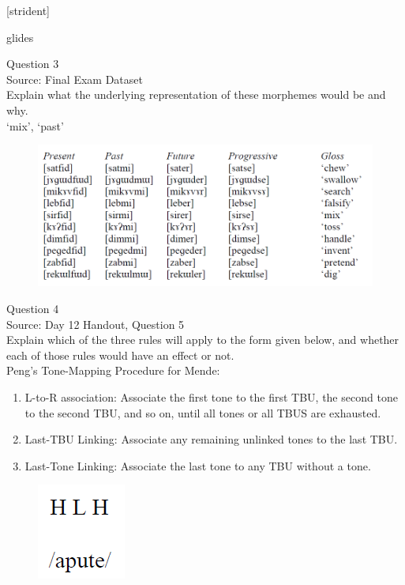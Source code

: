 \documentclass[12pt]{article}
\begin{document}
{[strident]}

glides


\newpage

{\large Question 3}\\

Source: Final Exam Dataset\\

Explain what the underlying representation of these morphemes would be and why.\\

`mix', `past'

\begin{figure}[H]
\includegraphics{../images/final_dataset.png}
\end{figure}

\newpage

{\large Question 4}\\

Source: Day 12 Handout, Question 5\\

Explain which of the three rules will apply to the form given below, and whether each of those rules would have an effect or not.\\

Peng’s Tone-Mapping Procedure for Mende: \begin{enumerate} \item L-to-R association: Associate the first tone to the first TBU, the second tone to the second TBU, and so on, until all tones or all TBUS are exhausted. \item Last-TBU Linking: Associate any remaining unlinked tones to the last TBU. \item Last-Tone Linking: Associate the last tone to any TBU without a tone. \end{enumerate}

\begin{figure}[H]
\includegraphics{../images/mendetone_a.png}
\end{figure}
\end{document}
